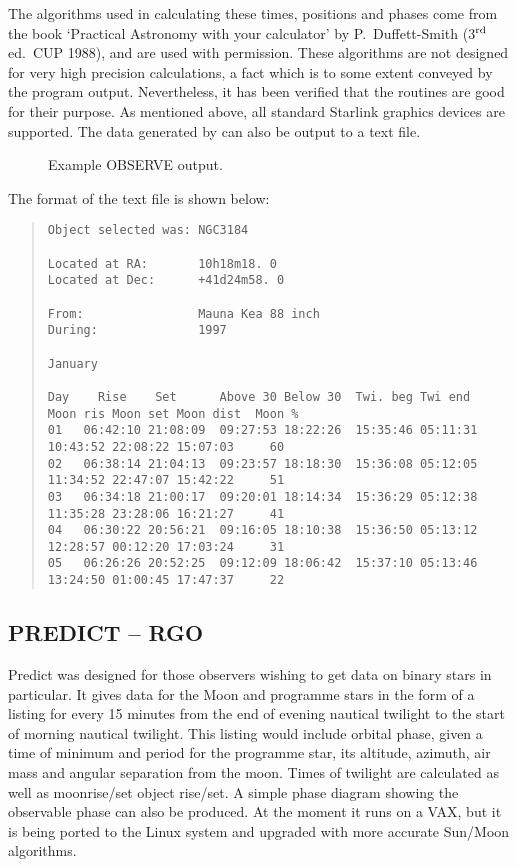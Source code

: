 The algorithms used in calculating these times, positions and phases come
from the book `Practical Astronomy with your calculator' by
P.~Duffett-Smith (3$^{\rm rd}$ ed.~CUP 1988), and are used with permission.
These algorithms are not designed for very high precision calculations, a
fact which is to some extent conveyed by the program output. Nevertheless,
it has been verified that the routines are good for their purpose. 
As mentioned above, all standard Starlink graphics devices are supported. 
The data generated by {\OBSERVEref} can also be output to a text file. 

\begin{figure}[htbp]
\leavevmode
\centering {}
\caption{Example OBSERVE output.}
\end{figure}

The format of the text file is shown below:
{\scriptsize
\begin{quote}
\begin{verbatim}
Object selected was: NGC3184
 
Located at RA:       10h18m18. 0
Located at Dec:      +41d24m58. 0
 
From:                Mauna Kea 88 inch
During:              1997
 
January                                                                   
 
Day    Rise    Set      Above 30 Below 30  Twi. beg Twi end   Moon ris Moon set Moon dist  Moon %
01   06:42:10 21:08:09  09:27:53 18:22:26  15:35:46 05:11:31  10:43:52 22:08:22 15:07:03     60
02   06:38:14 21:04:13  09:23:57 18:18:30  15:36:08 05:12:05  11:34:52 22:47:07 15:42:22     51
03   06:34:18 21:00:17  09:20:01 18:14:34  15:36:29 05:12:38  11:35:28 23:28:06 16:21:27     41
04   06:30:22 20:56:21  09:16:05 18:10:38  15:36:50 05:13:12  12:28:57 00:12:20 17:03:24     31
05   06:26:26 20:52:25  09:12:09 18:06:42  15:37:10 05:13:46  13:24:50 01:00:45 17:47:37     22
\end{verbatim}
\end{quote}
}

\subsection{PREDICT -- RGO} 
\label{sec:predict}
 
Predict was designed for those observers wishing to get data on binary stars
in particular. It gives data for the Moon and programme stars in the form of
a listing for every 15 minutes from the end of evening nautical twilight to
the start of morning nautical twilight. This listing would include orbital
phase, given a time of minimum and period for the programme star, its
altitude, azimuth, air mass and angular separation from the moon. Times of
twilight are calculated as well as moonrise/set object rise/set. A simple
phase diagram showing the observable phase can also be produced.  At the
moment it runs on a VAX, but it is being ported to the Linux system and upgraded 
with more accurate Sun/Moon algorithms. 


